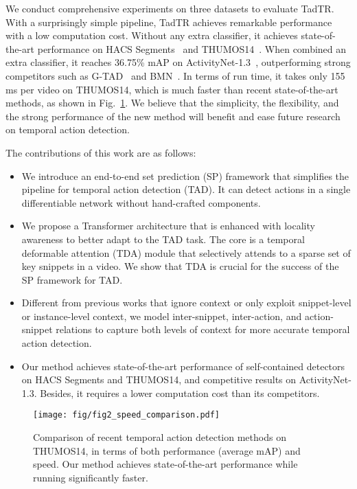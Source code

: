 \documentclass[lettersize,journal]{IEEEtran}
\begin{document}
We conduct comprehensive experiments on three datasets to evaluate TadTR. With a surprisingly simple pipeline, TadTR achieves remarkable performance with a low computation cost. Without any extra classifier, it achieves state-of-the-art performance on HACS Segments~\cite{zhao2019hacs} and THUMOS14~\cite{jiang2014thumos}. When combined an extra classifier, it reaches 36.75\% mAP on ActivityNet-1.3~\cite{caba2015activitynet}, outperforming strong competitors such as G-TAD~\cite{xu2020g} and BMN~\cite{lin2019bmn}.
In terms of run time, it takes only 155 ms per video on THUMOS14, which is much faster than  recent state-of-the-art methods, as shown in Fig.~\ref{fig:speed}.
We believe that the simplicity, the flexibility, and the strong performance of the new method will benefit and ease future research on temporal action detection.

The contributions of this work are as follows:
\begin{itemize}
    \item We introduce an end-to-end set prediction (SP) framework that simplifies the pipeline for temporal action detection (TAD). It can detect actions in a single differentiable network without hand-crafted components. 
    \item We propose a Transformer architecture that is enhanced with locality awareness to better adapt to the TAD task. The core is a temporal deformable attention (TDA) module that selectively attends to a sparse set of key snippets in a video. We show that TDA is crucial for the success of the SP framework for TAD.
    \item Different from previous works that ignore context or only exploit snippet-level or instance-level context, we model inter-snippet, inter-action, and action-snippet relations to capture both levels of context for more accurate temporal action detection.
    \item Our method achieves state-of-the-art performance of self-contained detectors on HACS Segments and THUMOS14, and competitive results on ActivityNet-1.3. Besides, it requires a lower computation cost than its competitors.
\end{itemize}

\begin{figure}[tb]
\centering
\texttt{[image: fig/fig2\_speed\_comparison.pdf]}
\caption{
Comparison of recent temporal action detection methods on THUMOS14, in terms of both performance (average mAP) and speed. Our method achieves state-of-the-art performance while running significantly faster.
}
\label{fig:speed}
\end{figure}
\end{document}
